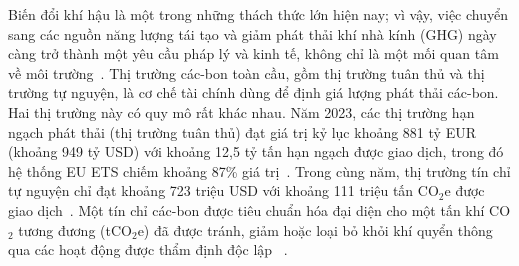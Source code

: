 Biến đổi khí hậu là một trong những thách thức lớn hiện nay; vì vậy, việc chuyển sang các nguồn năng lượng tái tạo và giảm phát thải khí nhà kính (GHG) ngày càng trở thành một yêu cầu pháp lý và kinh tế, không chỉ là một mối quan tâm về môi trường~\cite{columbia2025article6}. Thị trường các-bon toàn cầu, gồm thị trường tuân thủ và thị trường tự nguyện, là cơ chế tài chính dùng để định giá lượng phát thải các-bon. Hai thị trường này có quy mô rất khác nhau. Năm 2023, các thị trường hạn ngạch phát thải (thị trường tuân thủ) đạt giá trị kỷ lục khoảng 881 tỷ EUR (khoảng 949 tỷ USD) với khoảng 12,5 tỷ tấn hạn ngạch được giao dịch, trong đó hệ thống EU ETS chiếm khoảng 87\% giá trị~\cite{lseg2024yir}. Trong cùng năm, thị trường tín chỉ tự nguyện chỉ đạt khoảng 723 triệu USD với khoảng 111 triệu tấn CO$_2$e được giao dịch~\cite{foresttrends2024sovcm}. Một tín chỉ các-bon được tiêu chuẩn hóa đại diện cho một tấn khí CO$_2$ tương đương (tCO$_2$e) đã được tránh, giảm hoặc loại bỏ khỏi khí quyển thông qua các hoạt động được thẩm định độc lập~\cite{verra2024vcs} \cite{columbia2025article6}.

